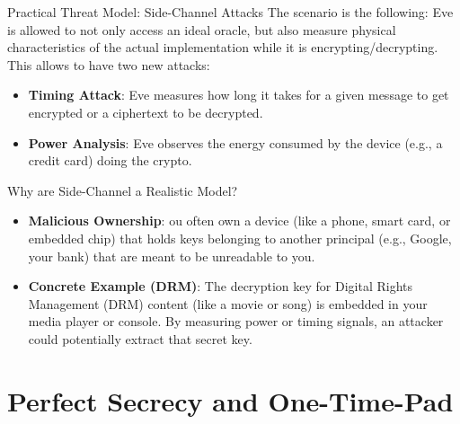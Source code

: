 \begin{parag}{Practical Threat Model: Side-Channel Attacks}
    The scenario is the following: Eve is allowed to not only access an ideal oracle, but also
measure physical characteristics of the actual implementation while it
is encrypting/decrypting. This allows to have two new attacks:
\begin{itemize}
    \item \textbf{Timing Attack}:  Eve measures how long it takes for a given message to
get encrypted or a ciphertext to be decrypted.
	\item \textbf{Power Analysis}: Eve observes the energy consumed by the device
(e.g., a credit card) doing the crypto.
\end{itemize}

	\begin{subparag}{Why are Side-Channel a Realistic Model?}
	    \begin{itemize}
	        \item \textbf{Malicious Ownership}: ou often own a device (like a phone, smart card, or embedded chip) that holds keys belonging to another principal (e.g., Google, your bank) that are meant to be unreadable to you.
	        \item \textbf{Concrete Example (DRM)}: The decryption key for Digital Rights Management (DRM) content (like a movie or song) is embedded in your media player or console. By measuring power or timing signals, an attacker could potentially extract that secret key.
	    \end{itemize}
	    
	\end{subparag}
\end{parag}






\section{Perfect Secrecy and One-Time-Pad}


